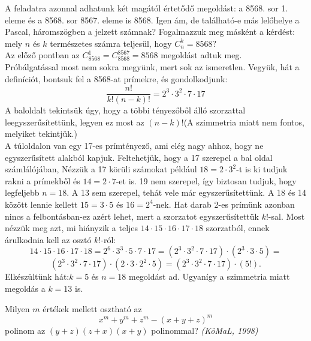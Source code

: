 \begin{solution}
A feladatra azonnal adhatunk két magától értetődő megoldást: a 8568.
sor 1. eleme és a 8568. sor 8567. eleme is 8568. Igen ám, de található-e
más lelőhelye a Pascal, háromszögben a jelzett számnak? Fogalmazzuk
meg másként a kérdést: mely $n$ és $k$ természetes számra teljesül,
hogy $C_{n}^{k}=8568?$\\
 Az előző pontban az $C_{8568}^{1}=C_{8568}^{8567}=8568$ megoldást
adtuk meg.\\
 Próbálgatással most nem sokra megyünk, mert sok az ismeretlen. Vegyük,
hát a definíciót, bontsuk fel a 8568-at prímekre, és gondolkodjunk:
\[
\dfrac{n!}{k!(n-k)!}=2^{3}\cdot3^{2}\cdot7\cdot17
\]
A baloldalt tekintsük úgy, hogy a többi tényezőből álló szorzattal
leegyszerűsítettünk, legyen ez most az $(n-k)!$(A szimmetria miatt
nem fontos, melyiket tekintjük.)\\
 A túloldalon van egy 17-es prímtényező, ami elég nagy ahhoz, hogy
ne egyszerűsített alakból kapjuk. Feltehetjük, hogy a 17 szerepel
a bal oldal számlálójában, Nézzük a 17 körüli számokat például $18=2\cdot3^{2}$-t
is ki tudjuk rakni a prímekből és $14=2\cdot7$-et is. 19 nem szerepel,
így biztosan tudjuk, hogy legfeljebb $n=18.$ A 13 sem szerepel, tehát
vele már egyszerűsítettünk. A 18 és 14 között lennie kellett $15=3\cdot5$
és $16=2^{4}$-nek. Hat darab 2-es prímünk azonban nincs a felbontásban-ez
azért lehet, mert a szorzatot egyszerűsítettük $k!$-sal. Most nézzük
meg azt, mi hiányzik a teljes $14\cdot15\cdot16\cdot17\cdot18$ szorzatból,
ennek árulkodnia kell az osztó $k!$-ról:
\[
14\cdot15\cdot16\cdot17\cdot18=2^{6}\cdot3^{3}\cdot5\cdot7\cdot17=(2^{3}\cdot3^{2}\cdot7\cdot17)\cdot(2^{3}\cdot3\cdot5)=
\]
\[
(2^{3}\cdot3^{2}\cdot7\cdot17)\cdot(2\cdot3\cdot2^{2}\cdot5)=(2^{3}\cdot3^{2}\cdot7\cdot17)\cdot(5!).
\]
Elkészültünk hát:$k=5$ és $n=18$ megoldást ad. Ugyanígy a szimmetria
miatt megoldás a $k=13$ is. 
\end{solution}
\begin{extraproblem}
Milyen $m$ értékek mellett osztható az 
\[
x^{m}+y^{m}+z^{m}-(x+y+z)^{m}
\]
polinom az $(y+z)(z+x)(x+y)$ polinommal? \emph{(KöMaL, 1998) }
\end{extraproblem}

